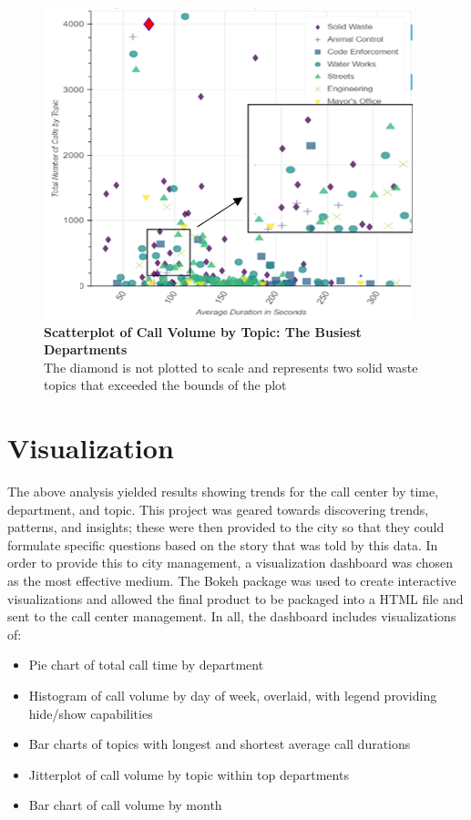 \documentclass[12pt]{article}
\begin{document}
	\begin{figure}
	\includegraphics[scale=.6]{scatter_ready.png}
	\caption{\textbf{Scatterplot of Call Volume by Topic: The Busiest Departments} \\
		The diamond is not plotted to scale and represents two solid waste topics that exceeded the bounds of the plot}
	\end{figure}






\section{Visualization}


The above analysis yielded results showing trends for the call center by time, department, and topic.  This project was geared towards discovering trends, patterns, and insights; these were then provided to the city so that they could formulate specific questions based on the story that was told by this data.  In order to provide this to city management, a visualization dashboard was chosen as the most effective medium.  The Bokeh package was used to create interactive visualizations and allowed the final product to be packaged into a HTML file and sent to the call center management.  In all, the dashboard includes visualizations of:

	\begin{itemize}
		\item Pie chart of total call time by department
		\item Histogram of call volume by day of week, overlaid, with legend providing hide/show capabilities
		\item Bar charts of topics with longest and shortest average call durations
		\item Jitterplot of call volume by topic within top departments
		\item Bar chart of call volume by month
	\end{itemize}
\end{document}
